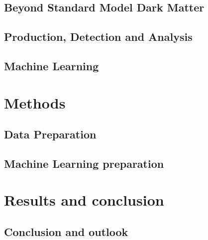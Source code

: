 \documentclass[12pt, a4paper]{book}
\begin{document}
\chapter{Beyond Standard Model Dark Matter}\label{chap:DM}


\chapter{Production, Detection and Analysis}\label{chap:CERN_method}


\chapter{Machine Learning}\label{chap:theo_ML}




\part{Methods}
\chapter{Data Preparation}\label{chap:data_prep}


\chapter{Machine Learning preparation}\label{chap:ML}


\part{Results and conclusion}

\chapter{Conclusion and outlook}\label{chap:conclusion}


\clearpage


\appendix























\clearpage
{}
{}
\printbibliography
\end{document}
